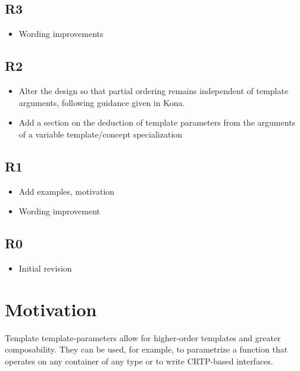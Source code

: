 \documentclass{wg21}
\begin{document}
\subsection{R3}

\begin{itemize}
\item Wording improvements
\end{itemize}

\subsection{R2}

\begin{itemize}
\item Alter the design so that partial ordering remains independent of template arguments, following guidance given in Kona.
\item Add a section on the deduction of template parameters from the arguments of a variable template/concept specialization
\end{itemize}


\subsection{R1}

\begin{itemize}
\item Add examples, motivation
\item Wording improvement
\end{itemize}

\subsection{R0}

\begin{itemize}
    \item{Initial revision}
\end{itemize}



\section{Motivation}

Template template-parameters allow for higher-order templates and greater composability.
They can be used, for example, to parametrize a function that operates on any container of any type or to write CRTP-based interfaces.
\end{document}
